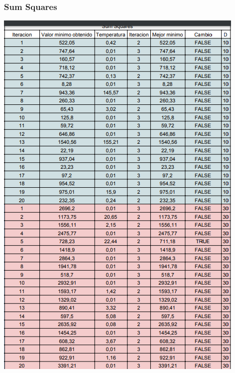\documentclass[10pt]{article}
\begin{document}
\subsubsection{Sum Squares}
\begin{center}
  \includegraphics[scale=0.5]{imgs/sum.png}
\end{center}
\end{document}
